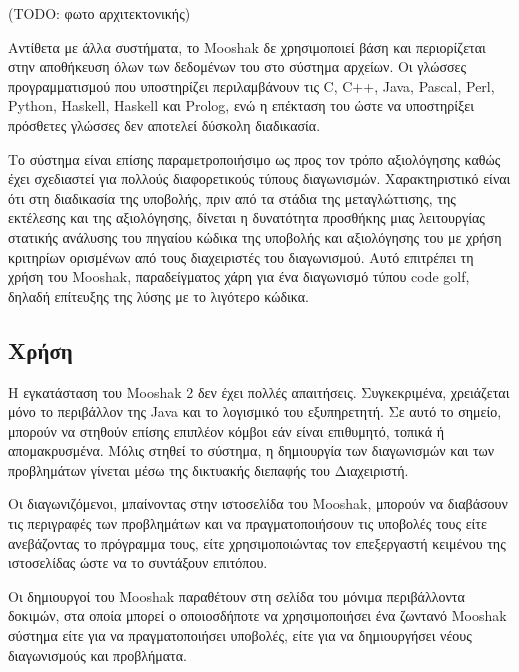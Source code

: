 \documentclass[diploma]{softlab-thesis}
\begin{document}
\bigskip

(TODO: φωτο αρχιτεκτονικής)

\bigskip

Αντίθετα με άλλα συστήματα, το Mooshak δε χρησιμοποιεί βάση και περιορίζεται
στην αποθήκευση όλων των δεδομένων του στο σύστημα αρχείων. Οι γλώσσες
προγραμματισμού που υποστηρίζει περιλαμβάνουν τις C, C++, Java, Pascal, Perl,
Python, Haskell, Haskell και Prolog, ενώ η επέκταση του ώστε να υποστηρίξει
πρόσθετες γλώσσες δεν αποτελεί δύσκολη διαδικασία.

\bigskip

Το σύστημα είναι επίσης παραμετροποιήσιμο ως προς τον τρόπο αξιολόγησης καθώς
έχει σχεδιαστεί για πολλούς διαφορετικούς τύπους διαγωνισμών. Χαρακτηριστικό
είναι ότι στη διαδικασία της υποβολής, πριν από τα στάδια της μεταγλώττισης,
της εκτέλεσης και της αξιολόγησης, δίνεται η δυνατότητα προσθήκης μιας
λειτουργίας στατικής ανάλυσης του πηγαίου κώδικα της υποβολής και αξιολόγησης
του με χρήση κριτηρίων ορισμένων από τους διαχειριστές του διαγωνισμού. Αυτό
επιτρέπει τη χρήση του Mooshak, παραδείγματος χάρη για ένα διαγωνισμό τύπου
code golf, δηλαδή επίτευξης της λύσης με το λιγότερο κώδικα.

\subsection{Χρήση}

Η εγκατάσταση του Mooshak 2 δεν έχει πολλές απαιτήσεις. Συγκεκριμένα,
χρειάζεται μόνο το περιβάλλον της Java και το λογισμικό του εξυπηρετητή. Σε
αυτό το σημείο, μπορούν να στηθούν επίσης επιπλέον κόμβοι εάν είναι επιθυμητό,
τοπικά ή απομακρυσμένα. Μόλις στηθεί το σύστημα, η δημιουργία των διαγωνισμών
και των προβλημάτων γίνεται μέσω της δικτυακής διεπαφής του Διαχειριστή.

\bigskip

Οι διαγωνιζόμενοι, μπαίνοντας στην ιστοσελίδα του Mooshak, μπορούν να διαβάσουν
τις περιγραφές των προβλημάτων και να πραγματοποιήσουν τις υποβολές τους είτε
ανεβάζοντας το πρόγραμμα τους, είτε χρησιμοποιώντας τον επεξεργαστή κειμένου της
ιστοσελίδας ώστε να το συντάξουν επιτόπου.

\bigskip

Οι δημιουργοί του Mooshak παραθέτουν στη σελίδα του μόνιμα περιβάλλοντα δοκιμών,
στα οποία μπορεί ο οποιοσδήποτε να χρησιμοποιήσει ένα ζωντανό Mooshak σύστημα είτε
για να πραγματοποιήσει υποβολές, είτε για να δημιουργήσει νέους διαγωνισμούς και
προβλήματα.
\end{document}
